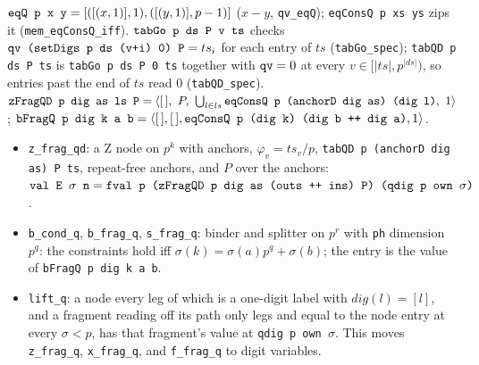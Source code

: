 \begin{definition}
$\textnormal{\texttt{eqQ p x y}} = [([(x,1)],1),([(y,1)],p-1)]$ ($x-y$, \textnormal{\texttt{qv\_\allowbreak{}eqQ}}); \textnormal{\texttt{eqConsQ p xs ys}}
zips it (\textnormal{\texttt{mem\_\allowbreak{}eqConsQ\_\allowbreak{}iff}}). $\textnormal{\texttt{tabGo p ds P v ts}}$ checks
$\textnormal{\texttt{qv (\allowbreak{}setDigs p ds (\allowbreak{}v+i) 0) P}} = ts_i$ for each entry of $ts$ (\textnormal{\texttt{tabGo\_\allowbreak{}spec}});
\textnormal{\texttt{tabQD p ds P ts}} is \textnormal{\texttt{tabGo p ds P 0 ts}} together with $\textnormal{\texttt{qv}} = 0$ at every
$v\in[|ts|, p^{|ds|})$, so entries past the end of $ts$ read $0$ (\textnormal{\texttt{tabQD\_\allowbreak{}spec}}).
$\textnormal{\texttt{zFragQD p dig as ls P}} = \langle[\,],\ P,\ \bigcup_{l\in ls}\textnormal{\texttt{eqConsQ p (\allowbreak{}anchorD dig as) (\allowbreak{}dig l)}},\ 1\rangle$;
$\textnormal{\texttt{bFragQ p dig k a b}} = \langle[\,],[\,],\textnormal{\texttt{eqConsQ p (\allowbreak{}dig k) (\allowbreak{}dig b ++ dig a)}},1\rangle$.
\end{definition}

\begin{theorem}
\begin{itemize}
\item \textnormal{\texttt{z\_\allowbreak{}frag\_\allowbreak{}qd}}: a Z node on $p^k$ with anchors, $\varphi_v = ts_v/p$,
  \textnormal{\texttt{tabQD p (\allowbreak{}anchorD dig as) P ts}}, repeat-free anchors, and $P$ over the anchors:
  $\textnormal{\texttt{val E \ensuremath{\sigma} n}} = \textnormal{\texttt{fval p (\allowbreak{}zFragQD p dig as (\allowbreak{}outs ++ ins) P) (\allowbreak{}qdig p own \ensuremath{\sigma})}}$.
\item \textnormal{\texttt{b\_\allowbreak{}cond\_\allowbreak{}q}}, \textnormal{\texttt{b\_\allowbreak{}frag\_\allowbreak{}q}}, \textnormal{\texttt{s\_\allowbreak{}frag\_\allowbreak{}q}}: binder and splitter on $p^r$ with
  \textnormal{\texttt{ph}} dimension $p^q$: the constraints hold iff $\sigma(k) = \sigma(a)p^q+\sigma(b)$; the
  entry is the value of \textnormal{\texttt{bFragQ p dig k a b}}.
\item \textnormal{\texttt{lift\_\allowbreak{}q}}: a node every leg of which is a one-digit label with $\mathit{dig}(l) = [l]$,
  and a fragment reading off its path only legs and equal to the node entry at every
  $\sigma<p$, has that fragment's value at \textnormal{\texttt{qdig p own \ensuremath{\sigma}}}. This moves \textnormal{\texttt{z\_\allowbreak{}frag\_\allowbreak{}q}},
  \textnormal{\texttt{x\_\allowbreak{}frag\_\allowbreak{}q}}, and \textnormal{\texttt{f\_\allowbreak{}frag\_\allowbreak{}q}} to digit variables.
\end{itemize}
\end{theorem}

